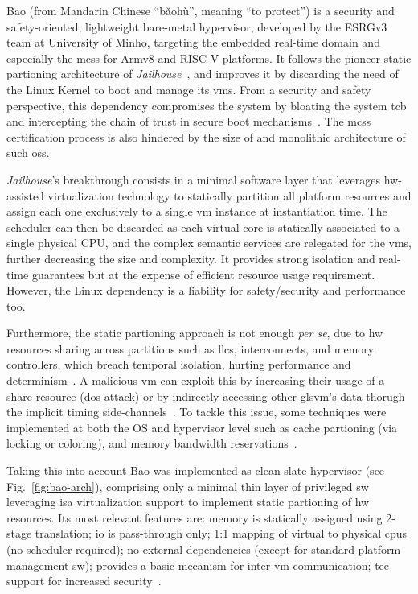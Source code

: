 Bao (from Mandarin Chinese ``bǎohù'', meaning ``to protect'') is a security and
safety-oriented, lightweight bare-metal hypervisor, developed by the ESRGv3 team
at University of Minho, targeting the embedded real-time domain and especially
the \glspl{mcs} for Armv8 and RISC-V platforms. It follows the pioneer static partioning architecture of
\emph{Jailhouse}~\cite{jailhouse}, and improves it by discarding the need of the
Linux Kernel to boot and manage its \glspl{vm}. From a security and
safety perspective, this dependency compromises the system by bloating the
system \gls{tcb} and intercepting the chain of trust in secure boot
mechanisms~\cite{martins_et_al:OASIcs:2020:11779}. The \glspl{mcs} certification
process is also hindered by the size of and monolithic architecture of such \glspl{os}.

\emph{Jailhouse}'s breakthrough consists in a minimal software layer that
leverages \gls{hw}-assisted virtualization technology to
statically partition all platform resources and assign each one exclusively to a
single \gls{vm} instance at instantiation time. The scheduler can then be
discarded as each virtual core is statically associated to a single physical
CPU, and the complex semantic services are relegated for the \glspl{vm}, further
decreasing the size and complexity. It provides strong isolation and real-time
guarantees but at the expense of efficient resource usage requirement. However,
the Linux dependency is a liability for safety/security and performance too.

Furthermore, the static partioning approach is not enough \emph{per se}, due to
\gls{hw} resources sharing across partitions such as \glspl{llc}, interconnects,
and memory controllers, which breach temporal isolation, hurting performance and
determinism~\cite{bansal2018evaluating,barham2003xen}. A malicious \gls{vm} can exploit this by increasing their
usage of a share resource (\gls{dos} attack) or by indirectly accessing other
gls{vm}'s data thorugh the implicit timing side-channels~\cite{ge2018survey}. To tackle this
issue, some techniques were implemented at both the OS and hypervisor level such
as cache partioning (via locking or coloring), and memory bandwidth
reservations~\cite{martins_et_al:OASIcs:2020:11779}.

Taking this into account Bao was implemented as clean-slate
hypervisor (see Fig.~\ref{fig:bao-arch}), comprising only a minimal thin layer of privileged \gls{sw}
leveraging \gls{isa} virtualization support to implement static partioning of
\gls{hw} resources. Its most relevant features are: memory is statically
assigned using 2-stage translation; \gls{io} is pass-through only; 1:1 mapping
of virtual to physical \glspl{cpu} (no scheduler required); no external
dependencies (except for standard platform management \gls{sw}); provides a
basic mecanism for inter-\gls{vm} communication; \gls{tee} support for increased
security~\cite{martins_et_al:OASIcs:2020:11779,baoEmbeddedWorld2020}.

